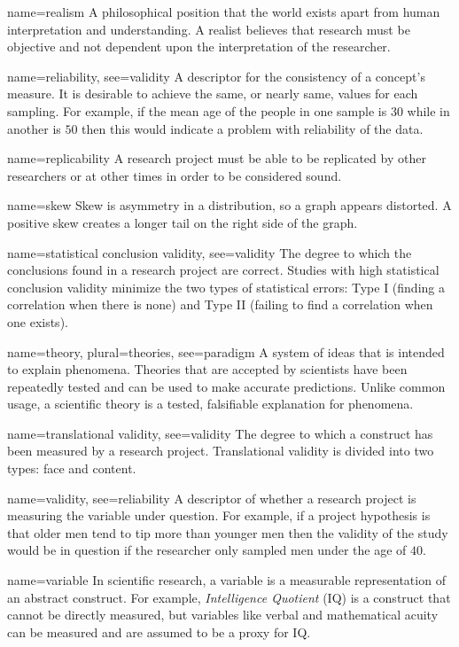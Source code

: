 {name={realism}}
{%
	A philosophical position that the world exists apart from human interpretation and understanding. A realist believes that research must be objective and not dependent upon the interpretation of the researcher.
}

	{name={reliability},
	 see={validity}}
	{%
		A descriptor for the consistency of a concept's measure. It is desirable to achieve the same, or nearly same, values for each sampling. For example, if the mean age of the people in one sample is $ 30 $ while in another is $ 50 $ then this would indicate a problem with reliability of the data.
	}

{name={replicability}}
{%
	A research project must be able to be replicated by other researchers or at other times in order to be considered sound.
}


{name={skew}}
{%
	Skew is asymmetry in a distribution, so a graph appears distorted. A positive skew creates a longer tail on the right side of the graph.
}

{name={statistical conclusion validity},
	see={validity}}
{%
	The degree to which the conclusions found in a research project are correct. Studies with high statistical conclusion validity minimize the two types of statistical errors: Type I (finding a correlation when there is none) and Type II (failing to find a correlation when one exists). 
}

{name={theory},
	plural={theories},
	see={paradigm}}
{%
	A system of ideas that is intended to explain phenomena. Theories that are accepted by scientists have been repeatedly tested and can be used to make accurate predictions. Unlike common usage, a scientific theory is a tested, falsifiable explanation for phenomena.
}

{name={translational validity},
	see={validity}}
{%
	The degree to which a construct has been measured by a research project. Translational validity is divided into two types: face and content.
}

{name={validity},
 see={reliability}}
{%
	A descriptor of whether a research project is measuring the variable under question. For example, if a project hypothesis is that older men tend to tip more than younger men then the validity of the study would be in question if the researcher only sampled men under the age of $ 40 $.
}

{name={variable}}
{%
	In scientific research, a variable is a measurable representation of an abstract construct. For example, \textit{Intelligence Quotient} (IQ) is a construct that cannot be directly measured, but variables like verbal and mathematical acuity can be measured and are assumed to be a proxy for IQ.
}
